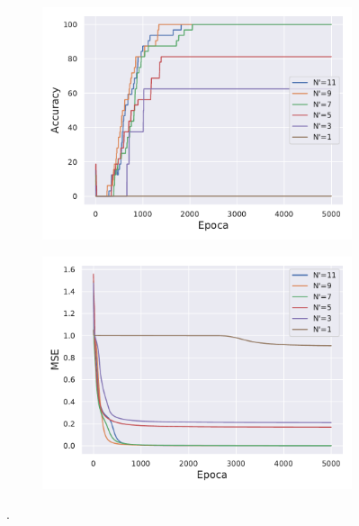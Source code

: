 \begin{figure}[h!]
    \centering
    \begin{subfigure}[h]{0.49\textwidth} 
        \includegraphics[width=\textwidth]{Figuras/ej2/Acc.pdf}
    \end{subfigure}       
    \begin{subfigure}[h]{0.49\textwidth} 
        \includegraphics[width=\textwidth]{Figuras/ej2/Loss.pdf}
    \end{subfigure}
    \caption{.} \label{fig:2_Resultados}
\end{figure}